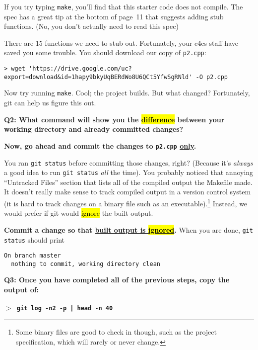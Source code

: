 \documentclass{article}
\begin{document}
\medskip
\noindent
If you try typing \texttt{make}, you'll find that this starter code does not
compile. The spec has a great tip at the bottom of page~11 that suggests
adding stub functions. {\small (No, you don't actually need to read this spec)}

\medskip
\noindent
There are 15 functions we need to stub out. Fortunately, your c4cs staff have
saved you some trouble. You should download our copy of \texttt{p2.cpp}:

\begin{Verbatim}[fontsize=\footnotesize]
> wget 'https://drive.google.com/uc?export=download&id=1hapy9bkyUqBERdWo8U6QCt5YfwSgRNld' -O p2.cpp
\end{Verbatim}

\noindent
Now try running \texttt{make}. Cool; the project builds. But what changed?
Fortunately, git can help us figure this out.

\textbf{Q2: What command will show you the \hl{difference} between your working
directory and already committed changes?}

\vspace{1.0cm}
\noindent
\textbf{Now, go ahead and commit the changes to \texttt{p2.cpp} \underline{only}.}

\newpage

\medskip
\noindent
You ran \texttt{git status} before committing those changes, right? (Because
it's \emph{always} a good idea to run \texttt{git status} \emph{all} the time).
You probably noticed that annoying ``Untracked Files'' section that
lists all of the compiled output the Makefile made. It doesn't really make
sense to track compiled output in a version control system (it is hard to
track changes on a binary file such as an executable).\footnote{%
  Some binary files are good to check in though, such as the project
  specification, which will rarely or never change.
}
Instead, we would prefer if git would \hl{ignore} the built output.

\medskip
\noindent
\textbf{Commit a change so that \underline{built output is \hl{ignored}}.} When you are done,
\texttt{git status} should print
\begin{Verbatim}[fontsize=\footnotesize]
  On branch master
  nothing to commit, working directory clean
\end{Verbatim}

\bigskip
\textbf{Q3: Once you have completed all of the previous steps, copy
the output of:\\
~\\
\texttt{$>$ git log -n2 -p | head -n 40}}
\end{document}
